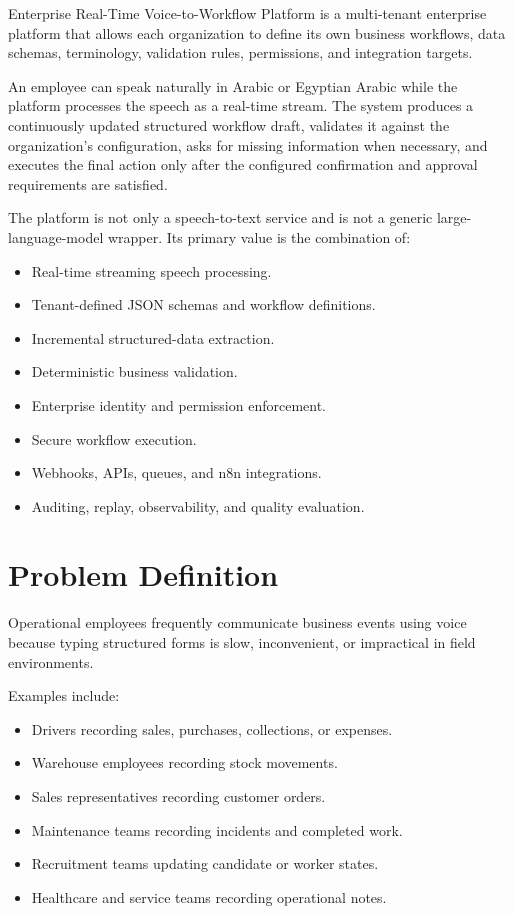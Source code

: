\documentclass[11pt,a4paper]{article}
\newcommand{\ProjectName}{Enterprise Real-Time Voice-to-Workflow Platform}
\begin{document}
\begin{executivebox}
\ProjectName{} is a multi-tenant enterprise platform that allows each
organization to define its own business workflows, data schemas,
terminology, validation rules, permissions, and integration targets.

An employee can speak naturally in Arabic or Egyptian Arabic while the
platform processes the speech as a real-time stream. The system produces
a continuously updated structured workflow draft, validates it against
the organization's configuration, asks for missing information when
necessary, and executes the final action only after the configured
confirmation and approval requirements are satisfied.

The platform is not only a speech-to-text service and is not a generic
large-language-model wrapper. Its primary value is the combination of:

\begin{itemize}
\item Real-time streaming speech processing.
\item Tenant-defined JSON schemas and workflow definitions.
\item Incremental structured-data extraction.
\item Deterministic business validation.
\item Enterprise identity and permission enforcement.
\item Secure workflow execution.
\item Webhooks, APIs, queues, and n8n integrations.
\item Auditing, replay, observability, and quality evaluation.
\end{itemize}
\end{executivebox}

\section{Problem Definition}

Operational employees frequently communicate business events using voice
because typing structured forms is slow, inconvenient, or impractical in
field environments.

Examples include:

\begin{itemize}
\item Drivers recording sales, purchases, collections, or expenses.
\item Warehouse employees recording stock movements.
\item Sales representatives recording customer orders.
\item Maintenance teams recording incidents and completed work.
\item Recruitment teams updating candidate or worker states.
\item Healthcare and service teams recording operational notes.
\end{itemize}
\end{document}
